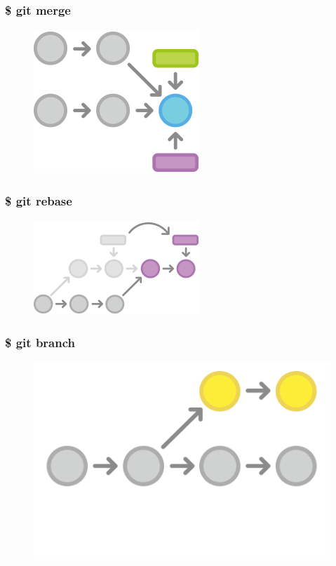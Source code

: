 \documentclass{beamer}
\begin{document}
\begin{frame}
    \frametitle{\$ git merge}
    \begin{figure}[h!]
        \begin{center}
            \includegraphics[scale=0.8]{merge.png}
        \end{center}
    \end{figure}
\end{frame}

\begin{frame}
    \frametitle{\$ git rebase}
    \begin{figure}[h!]
        \begin{center}
            \includegraphics[scale=1.1]{rebase.png}
        \end{center}
    \end{figure}
\end{frame}

\begin{frame}
    \frametitle{\$ git branch}
    \begin{figure}[h!]
        \begin{center}
            \includegraphics[scale=0.5]{branch.png}
        \end{center}
    \end{figure}
\end{frame}
\end{document}
